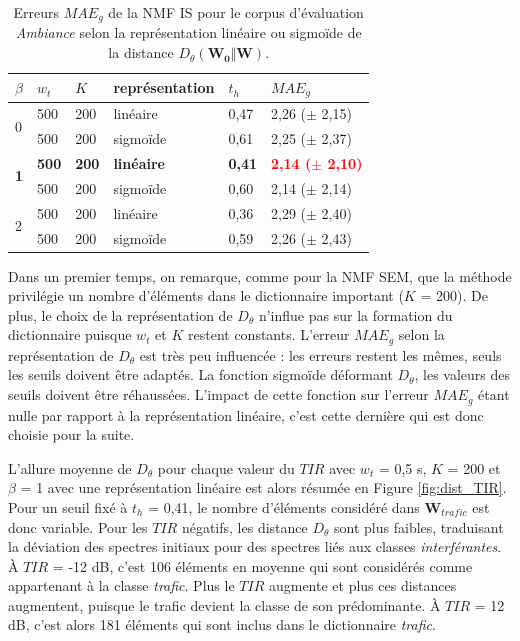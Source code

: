 \begin{table}[h]
\centering
\caption{Erreurs $MAE_g$ de la NMF IS pour le corpus d'évaluation \textit{Ambiance} selon la représentation linéaire ou sigmoïde de la distance $D_{\theta}(\mathbf{W_0}\Vert \mathbf{W})$.}
\label{tab:erreur_ambiance_IS}
\begin{tabular}{C{1.2cm}C{1.2cm}C{1.2cm}C{2.5cm}C{1.2cm}C{2.5cm}}
\toprule
{} & $w_t$ & $K$ & représentation & $t_h$ & $MAE_g$ \\ \toprule
{} & 500 & 200 & linéaire & 0,47 & 2,26 ($\pm$ 2,15) \\
 & 500 & 200 & sigmoïde & 0,61 & 2,25 ($\pm$ 2,37) \\ \midrule
{} & \textbf{500} & \textbf{200} & \textbf{linéaire} & \textbf{0,41} & \textbf{\textcolor{red}{2,14 ($\pm$ 2,10)}} \\
 & 500 & 200 & sigmoïde & 0,60 & 2,14 ($\pm$ 2,14) \\ \midrule
{} & 500 & 200 & linéaire & 0,36 & 2,29 ($\pm$ 2,40)\\
 & 500 & 200 & sigmoïde &  0,59 & 2,26 ($\pm$ 2,43)  \\
\bottomrule
\end{tabular}
\end{table}

Dans un premier temps, on remarque, comme pour la NMF SEM, que la méthode privilégie un nombre d'éléments dans le dictionnaire important ($K$ = 200). De plus, le choix de la représentation de $D_{\theta}$ n'influe pas sur la formation du dictionnaire puisque $w_t$ et $K$ restent constants.
L'erreur $MAE_g$ selon la représentation de $D_{\theta}$ est très peu influencée : les erreurs restent les mêmes, seuls les seuils doivent être adaptés. La fonction sigmoïde déformant $D_{\theta}$, les valeurs des seuils doivent être réhaussées. L'impact de cette fonction sur l'erreur $MAE_g$ étant nulle par rapport à la représentation linéaire, c'est cette dernière qui est donc choisie pour la suite. 

L'allure moyenne de $D_{\theta}$ pour chaque valeur du $TIR$ avec $w_t$ = 0,5 s, $K$ = 200 et $\beta$ = 1 avec une représentation linéaire est alors résumée en Figure \ref{fig:dist_TIR}. Pour un seuil fixé à $t_h$ = 0,41, le nombre d'éléments considéré dans $\mathbf{W}_{trafic}$ est donc variable. Pour les $TIR$ négatifs, les distance $D_{\theta}$ sont plus faibles, traduisant la déviation des spectres initiaux pour des spectres liés aux classes \textit{interférantes}. À $TIR$ = -12 dB, c'est 106 éléments en moyenne qui sont considérés comme appartenant à la classe \textit{trafic}. Plus le $TIR$ augmente et plus ces distances augmentent, puisque le trafic devient la classe de son prédominante. À $TIR$ = 12 dB, c'est alors 181 éléments qui sont inclus dans le dictionnaire \textit{trafic}.

